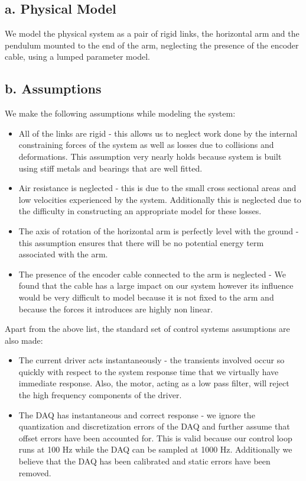 \documentclass{article}
\theoremstyle{plain}
\theoremstyle{definition}
\theoremstyle{remark}
\begin{document}
\subsection*{a. Physical Model}
We model the physical system as a pair of rigid links, the horizontal arm and the pendulum mounted to the end of the arm, neglecting the presence of the encoder cable, using a lumped parameter model.

\subsection*{b. Assumptions}
We make the following assumptions while modeling the system:
\begin{itemize}
\item All of the links are rigid - this allows us to neglect work done by the internal constraining forces of the system as well as losses due to collisions and deformations. This assumption very nearly holds because system is built using stiff metals and bearings that are well fitted.

\item Air resistance is neglected - this is due to the small cross sectional areas and low velocities experienced by the system. Additionally this is neglected due to the difficulty in constructing an appropriate model for these losses.

\item The axis of rotation of the horizontal arm is perfectly level with the ground -  this assumption ensures that there will be no potential energy term associated with the arm.

\item The presence of the encoder cable connected to the arm is neglected - We found that the cable has a large impact on our system however its influence would be very difficult to model because it is not fixed to the arm and because the forces it introduces are highly non linear.   
\end{itemize}

Apart from the above list, the standard set of control systems assumptions are also made:
\begin{itemize}
\item The current driver acts instantaneously - the transients involved occur so quickly with respect to the system response time that we virtually have immediate response. Also, the motor, acting as a low pass filter, will reject the high frequency components of the driver.

\item The DAQ has instantaneous and correct response - we ignore the quantization and discretization errors of the DAQ and further assume that offset errors have been accounted for. This is valid because our control loop runs at 100 Hz while the DAQ can be sampled at 1000 Hz. Additionally we believe that the DAQ has been calibrated and static errors have been removed.
\end{itemize}
\end{document}
